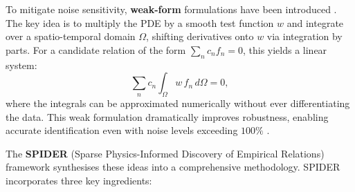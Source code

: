 \documentclass[preprint,12pt]{elsarticle}
\begin{document}
To mitigate noise sensitivity, \textbf{weak-form} formulations have been introduced \cite{gurevich2019robust,reinbold2020using,messenger2021weak}. The key idea is to multiply the PDE by a smooth test function $w$ and integrate over a spatio-temporal domain $\Omega$, shifting derivatives onto $w$ via integration by parts. For a candidate relation of the form $\sum_n c_n f_n = 0$, this yields a linear system:
\begin{equation}
\label{eq:weak-form}
\sum_n c_n \int_\Omega w\,f_n \,d\Omega = 0,
\end{equation}
where the integrals can be approximated numerically without ever differentiating the data. This weak formulation dramatically improves robustness, enabling accurate identification even with noise levels exceeding $100\%$ \cite{gurevich2024learning}.

The \textbf{SPIDER} (Sparse Physics-Informed Discovery of Empirical Relations) framework \cite{gurevich2024learning} synthesises these ideas into a comprehensive methodology. SPIDER incorporates three key ingredients:
\end{document}
